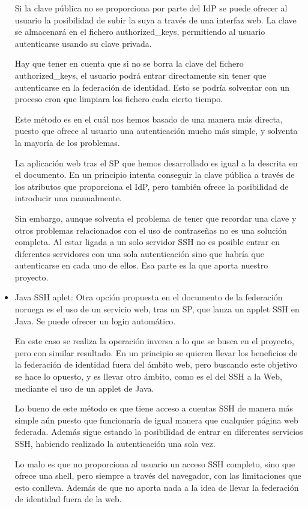 \begin{itemize}
        Si la clave pública no se proporciona por parte del IdP se
        puede ofrecer al usuario la posibilidad de subir la suya a
        través de una interfaz web. La clave se almacenará en el
        fichero authorized\_keys, permitiendo al usuario autenticarse
        usando su clave privada.

        Hay que tener en cuenta que si no se borra la clave del
        fichero authorized\_keys, el usuario podrá entrar directamente
        sin tener que autenticarse en la federación de identidad. Esto
        se podría solventar con un proceso cron que limpiara los
        fichero cada cierto tiempo.

        Este método es en el cuál nos hemos basado de una manera más
        directa, puesto que ofrece al usuario una autenticación mucho
        más simple, y solventa la mayoría de los problemas.

        La aplicación web tras el SP que hemos desarrollado es igual a
        la descrita en el documento. En un principio intenta conseguir
        la clave pública a través de los atributos que proporciona el
        IdP, pero también ofrece la posibilidad de introducir una
        manualmente.

        Sin embargo, aunque solventa el problema de tener que recordar
        una clave y otros problemas relacionados con el uso de
        contraseñas no es una solución completa. Al estar ligada a un
        solo servidor SSH no es posible entrar en diferentes
        servidores con una sola autenticación sino que habría que
        autenticarse en cada uno de ellos. Esa parte es la que aporta
        nuestro proyecto.

        \item{Java SSH aplet:}
        Otra opción propuesta en el documento de la federación noruega
        es el uso de un servicio web, tras un SP, que lanza un applet
        SSH en Java. Se puede ofrecer un login automático.

        En este caso se realiza la operación inversa a lo que se busca
        en el proyecto, pero con similar resultado. En un principio
        se quieren llevar los beneficios de la federación de identidad
        fuera del ámbito web, pero buscando este objetivo se hace lo
        opuesto, y es llevar otro ámbito, como es el del SSH a la Web,
        mediante el uso de un applet de Java.

        Lo bueno de este método es que tiene acceso a cuentas SSH de
        manera más simple aún puesto que funcionaría de igual manera
        que cualquier página web federada. Además sigue estando la
        posibilidad de entrar en diferentes servicios SSH, habiendo
        realizado la autenticación una sola vez.

        Lo malo es que no proporciona al usuario un acceso SSH completo,
        sino que ofrece una shell, pero siempre a través del navegador, con las
        limitaciones que esto conlleva. Además de que no aporta nada a
        la idea de llevar la federación de identidad fuera de la web.

    \end{itemize}

